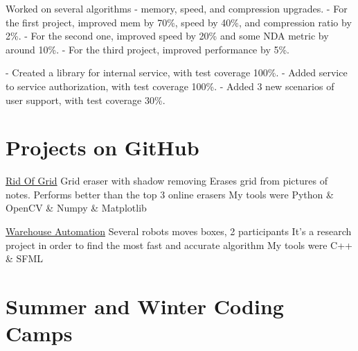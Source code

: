 \documentclass[12pt,a4paper]{moderncv}
\begin{document}
            {Worked on several algorithms - memory, speed, and compression upgrades. \newline
             - For the first project, improved mem by 70\%, speed by 40\%, and compression ratio by 2\%. \newline
             - For the second one, improved speed by 20\% and some NDA metric by around 10\%. \newline
             - For the third project, improved performance by 5\%.}
    
            {- Created a library for internal service, with test coverage 100\%. \newline
             - Added service to service authorization, with test coverage 100\%. \newline
             - Added 3 new scenarios of user support, with test coverage 30\%. \newline}
        
    \section{Projects on GitHub}
        
            {\href{https://github.com/a-alex-l/Rid_of_Grid} {Rid Of Grid}} {Grid eraser with shadow removing}
            {\newline Erases grid from pictures of notes. Performs better than the top 3 online erasers}{}
            {My tools were \textcolor{Attention} {Python \& OpenCV \& Numpy \& Matplotlib}}
        
            {\href{https://github.com/a-alex-l/Warehouse_Automation} {Warehouse Automation}} {Several robots moves boxes, 2 participants}
            {\newline It's a research project in order to find the most fast and accurate algorithm}{}
            {My tools were \textcolor{Attention} {C++ \& SFML}}
        
    \section{Summer and Winter Coding Camps}
        
\end{document}
